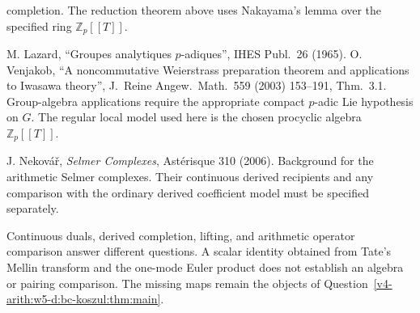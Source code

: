 \begin{description}
completion. The reduction theorem above uses Nakayama's lemma
over the specified ring \(\mathbb Z_p[[T]]\).
\item[\emph{Iwasawa algebra Noetherianity}] M. Lazard, ``Groupes
analytiques \(p\)-adiques'', IHES Publ.~26 (1965).
O. Venjakob, ``A
noncommutative Weierstrass preparation theorem and applications to
Iwasawa theory'', J.~Reine Angew.~Math.~559 (2003) 153--191,
Thm.~3.1. Group-algebra applications require the appropriate
compact \(p\)-adic Lie hypothesis on \(G\).
The regular local model used here is the chosen procyclic
algebra \(\mathbb Z_p[[T]]\).
\item[\emph{Nekov\'a\v{r}}] J. Nekov\'a\v{r}, \emph{Selmer
Complexes}, Ast\'erisque 310 (2006). Background for the arithmetic
Selmer complexes. Their continuous derived recipients and any
comparison with the ordinary derived coefficient model must be
specified separately.
\end{description}

\begin{remark}
\label{v4-arith:w5-d:rem:disjointness}
Continuous duals, derived completion, lifting, and arithmetic operator
comparison answer different questions. A scalar identity obtained from
Tate's Mellin transform and the one-mode Euler product does not establish
an algebra or pairing comparison. The missing maps remain the objects
of Question~\ref{v4-arith:w5-d:bc-koszul:thm:main}.
\end{remark}
